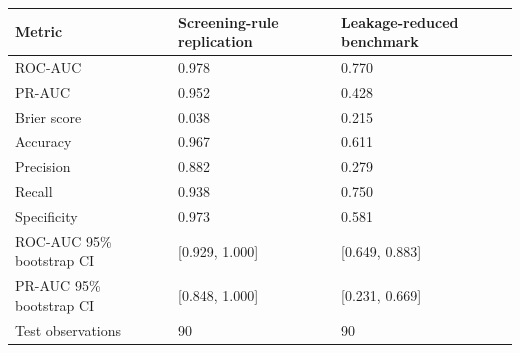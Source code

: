 \begin{tabular}{lll}
\toprule
Metric & Screening-rule replication & Leakage-reduced benchmark \\
\midrule
ROC-AUC & 0.978 & 0.770 \\
PR-AUC & 0.952 & 0.428 \\
Brier score & 0.038 & 0.215 \\
Accuracy & 0.967 & 0.611 \\
Precision & 0.882 & 0.279 \\
Recall & 0.938 & 0.750 \\
Specificity & 0.973 & 0.581 \\
ROC-AUC 95\% bootstrap CI & [0.929, 1.000] & [0.649, 0.883] \\
PR-AUC 95\% bootstrap CI & [0.848, 1.000] & [0.231, 0.669] \\
Test observations & 90 & 90 \\
\bottomrule
\end{tabular}
